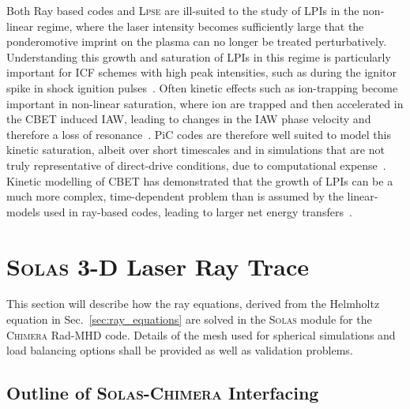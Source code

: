 Both Ray based codes and \textsc{Lpse} are ill-suited to the study of \ac{LPIs} in the non-linear regime, where the laser intensity becomes sufficiently large that the ponderomotive imprint on the plasma can no longer be treated perturbatively.
Understanding this growth and saturation of \ac{LPIs} in this regime is particularly important for \ac{ICF} schemes with high peak intensities, such as during the ignitor spike in shock ignition pulses~\cite{perkins_shock_2009}.
Often kinetic effects such as ion-trapping become important in non-linear saturation, where ion are trapped and then accelerated in the \ac{CBET} induced \ac{IAW}, leading to changes in the \ac{IAW} phase velocity and therefore a loss of resonance~\cite{nguyen_cross-beam_2021}.
\ac{PiC} codes are therefore well suited to model this kinetic saturation, albeit over short timescales and in simulations that are not truly representative of direct-drive conditions, due to computational expense~\cite{seaton_cross-beam_2022-1}.
Kinetic modelling of \ac{CBET} has demonstrated that the growth of \ac{LPIs} can be a much more complex, time-dependent problem than is assumed by the linear-models used in ray-based codes, leading to larger net energy transfers~\cite{seaton_cross-beam_2022}.

\section{\textsc{Solas} 3-D Laser Ray Trace}%
\label{sec:SOLAS_raytrace}

This section will describe how the ray equations, derived from the Helmholtz equation in Sec.~\ref{sec:ray_equations} are solved in the \textsc{Solas} module for the \textsc{Chimera} \ac{Rad-MHD} code.
Details of the mesh used for spherical simulations and load balancing options shall be provided as well as validation problems.

\subsection{Outline of \textsc{Solas}-\textsc{Chimera} Interfacing}

